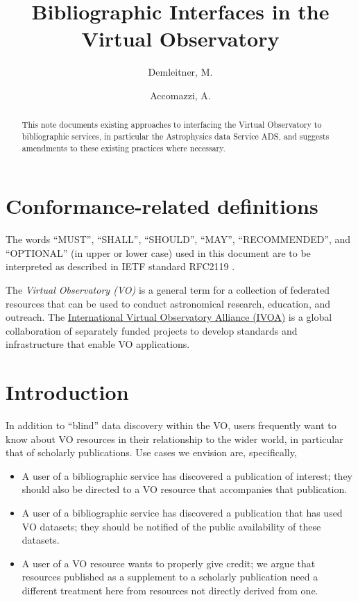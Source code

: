 \documentclass[11pt,a4paper]{ivoa}
\title{Bibliographic Interfaces in the Virtual Observatory}
\author[http://www.ivoa.net/cgi-bin/twiki/bin/view/IVOA/MarkusDemleitner]{Demleitner, M.}
\author{Accomazzi, A.}
\begin{document}
\begin{abstract}
This note documents existing approaches to interfacing the Virtual
Observatory to bibliographic services, in particular the Astrophysics
data Service ADS, and suggests amendments to these existing practices
where necessary.
\end{abstract}


\section*{Conformance-related definitions}

The words ``MUST'', ``SHALL'', ``SHOULD'', ``MAY'', ``RECOMMENDED'', and
``OPTIONAL'' (in upper or lower case) used in this document are to be
interpreted as described in IETF standard RFC2119 \citep{std:RFC2119}.

The \emph{Virtual Observatory (VO)} is a
general term for a collection of federated resources that can be used
to conduct astronomical research, education, and outreach.
The \href{https://www.ivoa.net}{International
Virtual Observatory Alliance (IVOA)} is a global
collaboration of separately funded projects to develop standards and
infrastructure that enable VO applications.


\section{Introduction}

In addition to ``blind'' data discovery within the VO, users frequently
want to know about VO resources in their relationship to the wider
world, in particular that of scholarly publications.  Use cases we
envision are, specifically,

\begin{itemize}
\item A user of a bibliographic service has discovered a publication of
interest; they should also be directed to a VO resource that accompanies
that publication.

\item A user of a bibliographic service has discovered a publication
that has used VO datasets; they should be notified of the public
availability of these datasets.

\item A user of a VO resource wants to properly give credit; we
argue that resources published as a supplement to a scholarly
publication need a different treatment here from resources not directly
derived from one.
\end{itemize}
\end{document}
